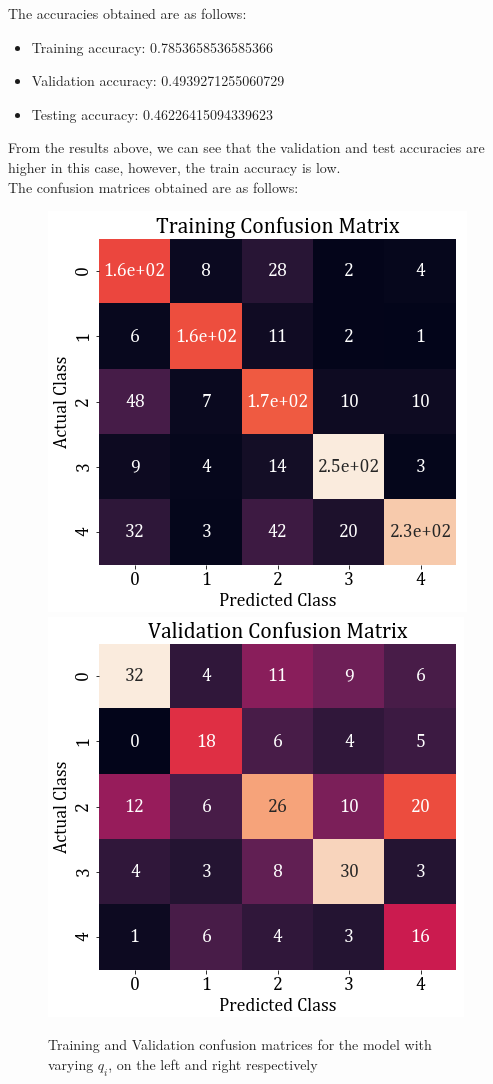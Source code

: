 \documentclass[11pt,a4paper]{article}
\newcommand{\noi}{\noindent}
\begin{document}
\noi
The accuracies obtained are as follows:
\begin{itemize}
    \itemsep0em
    \item Training accuracy: 0.7853658536585366
    \item Validation accuracy: 0.4939271255060729
    \item Testing accuracy: 0.46226415094339623
\end{itemize}

\noi
From the results above, we can see that the validation and test accuracies are higher in this case, however, the train accuracy is low.\\

\noi
The confusion matrices obtained are as follows:
\begin{figure}[H]
    \centering
    \includegraphics[scale=0.5]{images/2a_full_cross_train.png}
    \includegraphics[scale=0.5]{images/2a_full_cross_val.png}
    \caption{Training and Validation confusion matrices for the model with varying $q_i$, on the left and right respectively}
\end{figure}
\end{document}
